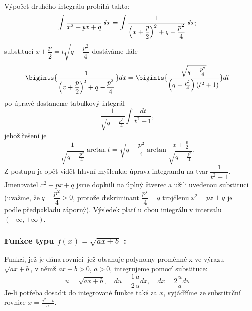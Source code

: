       Výpočet druhého integrálu probíhá takto: 
      \begin{equation}\label{MA:int_ex_10}
        \int\dfrac{1}{x^2+px+q}\hspace{2pt}dx = 
          \int\dfrac{1}{\left(x+\dfrac{p}{2}\right)^2 + q - \dfrac{p^2}{4}}\hspace{2pt}dx;
      \end{equation}
      substitucí $x+\dfrac{p}{2} = t\sqrt{q - \dfrac{p^2}{4}}$ dostáváme dále
      \begin{equation*}\label{MA:int_ex_11}
        \bigints{\frac{1}{\displaystyle{\left(x+\frac{p}{2}\right)^2 + q - \frac{p^2}{4}}}}dx 
          =\displaystyle{
            \bigints{
              \frac{\sqrt{q-\frac{p^2}{4}}}{\left(q-\frac{p^2}{4}\right)(t^2+1)}}dt
            }   
      \end{equation*}
      po úpravě dostaneme tabulkový integrál
      \begin{equation}\label{MA:int_ex_12}
        \frac{1}{\sqrt{q-\frac{p^2}{4}}}\int{\frac{dt}{t^2+1}},
      \end{equation}
      jehož řešení je  
      \begin{equation*}\label{MA:int_ex_13}
        \frac{1}{\sqrt{q-\frac{p^2}{4}}}\arctan{t} 
          = \sqrt{q-\frac{p^2}{4}}\arctan\frac{x+\frac{p}{2}}{\sqrt{q-\frac{p^2}{4}}}.     
      \end{equation*}   
      Z postupu je opět vidět hlavní myšlenka: úprava integrandu na tvar $\dfrac{1}{t^2+1}$.
      Jmenovatel $x^2+px+q$ jsme doplnili na úplný čtverec a užili uvedenou substituci (uvažme,
      že $q-\dfrac{p^2}{4}>0$, protože diskriminant $\dfrac{p^2}{4}-q$ trojčlenu $x^2+px+q$ je
      podle předpokladu záporný). Výsledek platí u obou integrálu v intervalu \((-\infty,
      +\infty)\).
      
      \subsubsection*{Funkce typu $\boxed{f(x)=\sqrt{ax+b}}$ :}
         Funkci, jež je dána rovnicí, jež obsahuje polynomy proměnné x  ve výrazu $\sqrt{ax+b}$,
         v němž $ax+b>0$, $a>0$, integrujeme pomocí substituce:
         \begin{equation}\label{ma:eq_sub_fce1}
             u=\sqrt{ax+b},\quad du=\frac{1}{2}\frac{a}{u}dx,\quad dx=2\frac{u}{a}du
         \end{equation}
         Je-li potřeba dosadit do integrované funkce také za $x$, vyjádříme ze substituční
         rovnice $x=\frac{u^2-b}{a}$.
